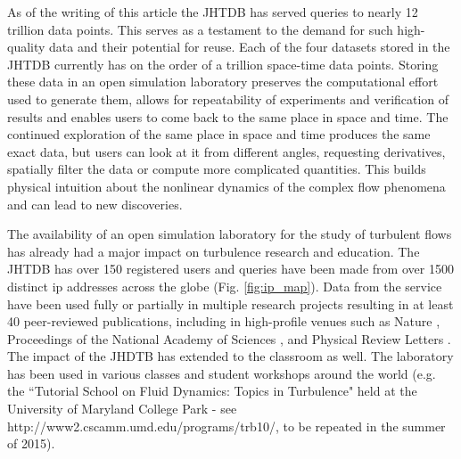 \documentclass[10pt,twocolumn]{article}
\begin{document}
As of the writing of this article the JHTDB has served queries to nearly 12 trillion data points. This serves as a testament to the demand for such high-quality
data and their potential for reuse. Each of the four datasets stored in the JHTDB currently has on the order of a trillion space-time data points. Storing
these data in an open simulation laboratory preserves the computational effort used to generate them, allows for repeatability of experiments and 
verification of results and enables users to come back to the same place in space and time. The continued exploration of the same place in space and 
time produces the same exact data, but users can look at it from different angles, requesting derivatives, spatially filter the data or compute more 
complicated quantities. 
This builds physical intuition about the nonlinear dynamics of the complex flow phenomena and can lead to new discoveries. 

The availability of an open simulation laboratory for the study of turbulent flows has already had a major impact on turbulence research and education. 
The JHTDB has over 150 registered users and queries have been made from over 1500 distinct ip addresses across the globe (Fig. \ref{fig:ip_map}).
Data from the service have been used fully or partially in multiple research projects resulting in at least 40 peer-reviewed publications, including in
high-profile venues such as Nature \cite{Eyink}, Proceedings of the National Academy of Sciences \cite{xu2014flight}, 
and Physical Review Letters \cite{gustavsson2014tumbling, jucha2014time}. 
The impact of the JHDTB has extended to the classroom as well. The laboratory has been used in various classes and student workshops 
around the world (e.g. the ``Tutorial School on Fluid Dynamics: Topics in Turbulence" held at the University of Maryland College Park - 
see http://www2.cscamm.umd.edu/programs/trb10/, to be repeated in the summer of 2015).
\end{document}
